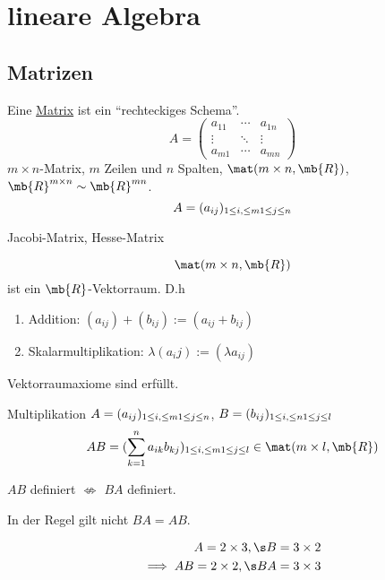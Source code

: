 \section{lineare Algebra}
\subsection{Matrizen}
\begin{Def}
  Eine \ul{Matrix} ist ein ``rechteckiges Schema''.
  \[A= \begin{pmatrix}
    a_{11}&\cdots&a_{1n}\\
    \vdots & \ddots & \vdots\\
    a_{m1}&\cdots&a_{mn}
  \end{pmatrix}\]
  $m\times n$-Matrix, $m$ Zeilen und $n$ Spalten, $\mat(m\times n,\mb{R})$, $\mb{R}^{m\times n}\sim \mb{R}^{mn}$.
  \[A=(a_{ij})_{1\leq i, \leq m\\ 1\leq j \leq n}\]
\end{Def}
\begin{Bsp}
  Jacobi-Matrix, Hesse-Matrix
\end{Bsp}
\begin{Def}
  \[\mat(m\times n,\mb{R})\]
  ist ein $\mb{R}$-Vektorraum. D.h
  \begin{enumerate}
    \item Addition: $(a_{ij})+(b_{ij}):=(a_{ij}+b_{ij})$
    \item Skalarmultiplikation: $\lambda(a_ij):=(\lambda a_{ij})$
  \end{enumerate}
  Vektorraumaxiome sind erfüllt.
\end{Def}
\begin{Def} Multiplikation
  $A=(a_{ij})_{1\leq i, \leq m\\ 1\leq j \leq n}$, $B=(b_{ij})_{1\leq i, \leq n\\ 1\leq j \leq l}$
  \[AB=(\sum^n_{k=1}a_{ik}b_{kj})_{1\leq i, \leq m\\ 1\leq j \leq l}\in\mat(m\times l,\mb{R})\]
\end{Def}
\begin{Bem}
  $AB$ definiert $\not\iff$ $BA$ definiert.
\end{Bem}
\begin{Bem}
  In der Regel gilt nicht $BA=AB$.
\end{Bem}
\begin{Bsp}
  \begin{eqnarray*}
    A=2\times 3,\s B=3\times 2\\
    \implies AB=2\times 2,\s BA=3\times 3
  \end{eqnarray*}
\end{Bsp}

